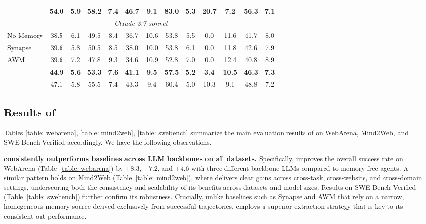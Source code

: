 \begin{table}[t]
\begin{tabular}{lcccccccccccc}
    \dab{+\mats{}} &54.0 & 5.9&58.2&7.4&46.7&9.1&83.0&5.3&20.7&7.2&56.3&7.1\\
    \midrule
    \multicolumn{13}{c}{\cellcolor{gray!15}\textit{Claude-3.7-sonnet}} \\
    No Memory&38.5&6.1&49.5&8.4&36.7&10.6&53.8&5.5&0.0&11.6&41.7&8.0\\
    Synapse&39.6&5.8&50.5&8.5&38.0&10.0&53.8&6.1&0.0&11.8&42.6&7.9\\
    AWM&39.6&7.2&47.8&9.3&34.6&10.9&52.8&7.0&0.0&12.4&40.8&8.9\\
    \hdashline
    \ours{} &\textbf{44.9}&\textbf{5.6}&\textbf{53.3}&\textbf{7.6}&\textbf{41.1}&\textbf{9.5}&\textbf{57.5}&\textbf{5.2}&\textbf{3.4}&\textbf{10.5}&\textbf{46.3}&\textbf{7.3} \\
    \dab{+\mats{}} &47.1&5.8&55.5&7.4&43.3&9.4&60.4&5.0&10.3&9.1&48.8&7.2\\

  \bottomrule
\end{tabular}
\vspace{-5mm}
\end{table}

\subsection{Results of \ours{}}

Tables \ref{table: webarena}, \ref{table: mind2web}, \ref{table: swebench} summarize the main evaluation results of \ours{} on WebArena, Mind2Web, and SWE-Bench-Verified accordingly. We have the following observations.

\noindent\textbf{\ours{} consistently outperforms baselines across LLM backbones on all datasets.}
Specifically, \ours{} improves the overall success rate on WebArena (Table~\ref{table: webarena}) by $+8.3$, $+7.2$, and $+4.6$ with three different backbone LLMs compared to memory-free agents. A similar pattern holds on Mind2Web (Table~\ref{table: mind2web}), where \ours{} delivers clear gains across cross-task, cross-website, and cross-domain settings, underscoring both the consistency and scalability of its benefits across datasets and model sizes. Results on SWE-Bench-Verified (Table~\ref{table: swebench}) further confirm its robustness. 
Crucially, unlike baselines such as Synapse and AWM that rely on a narrow, homogeneous memory source derived exclusively from successful trajectories, \ours{} employs a superior extraction strategy that is key to its consistent out-performance.

